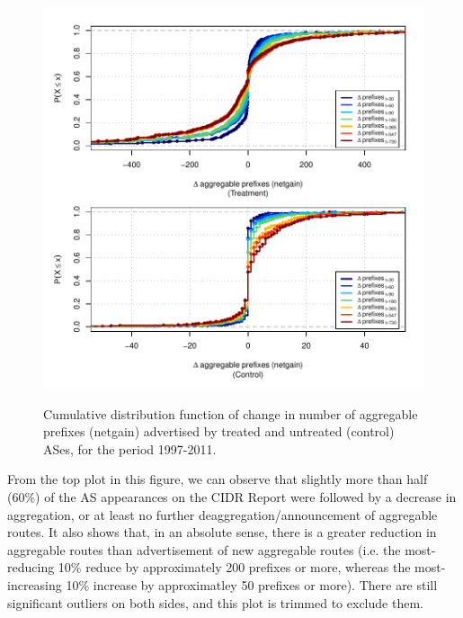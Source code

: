 \begin{figure}[h!]
\begin{centering}
\begin{singlespace}
    \includegraphics[width=6in]{figures/behavior-netgain-1997_2011-corr.pdf}
    \vspace{-2em}\\
    \caption{Cumulative distribution function of change in number of aggregable
    prefixes (netgain) advertised by treated and untreated (control) ASes, for
    the period 1997-2011.}
    \label{fig:delta_netgain_cdf}
\end{singlespace}
\end{centering}
\end{figure}

From the top plot in this figure, we can observe that slightly more than half
(60\%) of the AS appearances on the CIDR Report were followed by a decrease in
aggregation, or at least no further deaggregation/announcement of aggregable
routes. It also shows that, in an absolute sense, there is a greater reduction
in aggregable routes than advertisement of new aggregable routes (i.e. the
most-reducing 10\% reduce by approximately 200 prefixes or more, whereas the
most-increasing 10\% increase by approximatley 50 prefixes or more). There are
still significant outliers on both sides, and this plot is trimmed to exclude
them.


